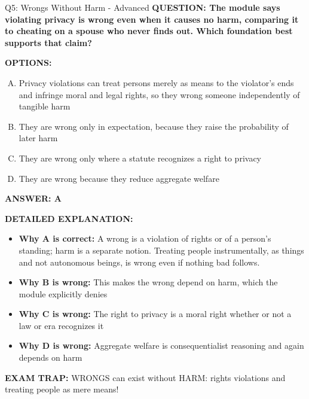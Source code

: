 \documentclass[8pt]{beamer}
\begin{document}
\begin{frame}[shrink=6]{Q5: Wrongs Without Harm - Advanced}
\fontsize{6.5}{7.5}\selectfont
\textbf{QUESTION: The module says violating privacy is wrong even when it causes no harm, comparing it to cheating on a spouse who never finds out. Which foundation best supports that claim?}

\vspace{0.1cm}
\textbf{OPTIONS:}
\begin{enumerate}[A.]
\item Privacy violations can treat persons merely as means to the violator's ends and infringe moral and legal rights, so they wrong someone independently of tangible harm
\item They are wrong only in expectation, because they raise the probability of later harm
\item They are wrong only where a statute recognizes a right to privacy
\item They are wrong because they reduce aggregate welfare
\end{enumerate}

\vspace{0.1cm}
\textcolor{myblue}{\textbf{ANSWER: A}}

\vspace{0.1cm}
\textbf{DETAILED EXPLANATION:}
\begin{itemize}
\item \textbf{Why A is correct:} A wrong is a violation of rights or of a person's standing; harm is a separate notion. Treating people instrumentally, as things and not autonomous beings, is wrong even if nothing bad follows.
\item \textbf{Why B is wrong:} This makes the wrong depend on harm, which the module explicitly denies
\item \textbf{Why C is wrong:} The right to privacy is a moral right whether or not a law or era recognizes it
\item \textbf{Why D is wrong:} Aggregate welfare is consequentialist reasoning and again depends on harm
\end{itemize}

\textcolor{myred}{\textbf{EXAM TRAP:}} WRONGS can exist without HARM: rights violations and treating people as mere means!
\end{frame}
\end{document}
